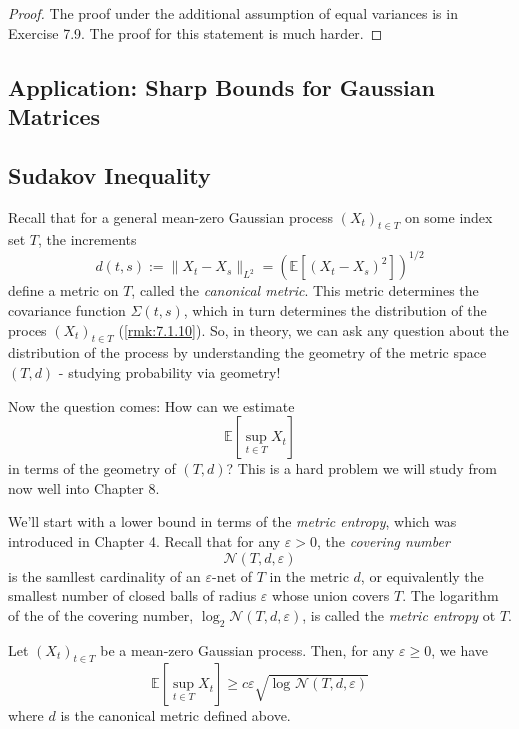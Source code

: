 \begin{proof}
The proof under the additional assumption of equal variances is in Exercise 7.9. The proof for this statement 
is much harder.
\end{proof}



\subsection{Application: Sharp Bounds for Gaussian Matrices}



\subsection{Sudakov Inequality}
Recall that for a general mean-zero Gaussian process $(X_t)_{t \in T}$ on some index set $T$, the increments 
\[ d(t, s) := \lVert X_t - X_s \rVert_{L^2} = (\mathbb{E}\left[ (X_t - X_s)^2 \right])^{1/2} \]
define a metric on $T$, called the \textit{canonical metric}. This metric determines the covariance function 
$\Sigma(t, s)$, which in turn determines the distribution of the proces $(X_t)_{t \in T}$ (\cref{rmk:7.1.10}). 
So, in theory, we can ask any question about the distribution of the process by understanding the geometry of 
the metric space $(T, d)$ - studying probability via geometry!

Now the question comes: How can we estimate 
\[ \mathbb{E}\left[ \sup_{t \in T} X_t \right] \]
in terms of the geometry of $(T, d)$? This is a hard problem we will study from now well into Chapter 8.

We'll start with a lower bound in terms of the \textit{metric entropy}, which was introduced in Chapter 4. 
Recall that for any $\varepsilon > 0$, the \textit{covering number} 
\[ \mathcal{N}(T, d, \varepsilon) \]
is the samllest cardinality of an $\varepsilon$-net of $T$ in the metric $d$, or equivalently the smallest 
number of closed balls of radius $\varepsilon$ whose union covers $T$. The logarithm of the of the covering 
number, $\log_{2}{\mathcal{N}(T, d, \varepsilon)}$, is called the \textit{metric entropy} ot $T$.

\begin{theorem}
\label{thm:7.4.1}
Let $(X_t)_{t \in T}$ be a mean-zero Gaussian process. Then, for any $\varepsilon \geq 0$, we have 
\[ \mathbb{E}\left[ \sup_{t \in T} X_t \right] \geq c \varepsilon \sqrt{\log_{}{\mathcal{N}(T, d, 
\varepsilon)}} \]
where $d$ is the canonical metric defined above.
\end{theorem}

